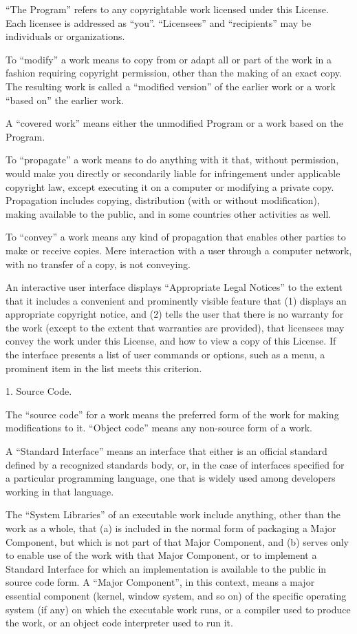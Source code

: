 \documentclass[letterpaper,12pt]{article}
\begin{document}
{``The Program'' refers to any copyrightable work licensed under this License. Each licensee is addressed as ``you''. ``Licensees'' and ``recipients'' may be individuals or organizations.

To ``modify'' a work means to copy from or adapt all or part of the work in a fashion requiring copyright permission, other than the making of an exact copy. The resulting work is called a ``modified version'' of the earlier work or a work ``based on'' the earlier work.

A ``covered work'' means either the unmodified Program or a work based on the Program.

To ``propagate'' a work means to do anything with it that, without permission, would make you directly or secondarily liable for infringement under applicable copyright law, except executing it on a computer or modifying a private copy. Propagation includes copying, distribution (with or without modification), making available to the public, and in some countries other activities as well.

To ``convey'' a work means any kind of propagation that enables other parties to make or receive copies. Mere interaction with a user through a computer network, with no transfer of a copy, is not conveying.

An interactive user interface displays ``Appropriate Legal Notices'' to the extent that it includes a convenient and prominently visible feature that (1) displays an appropriate copyright notice, and (2) tells the user that there is no warranty for the work (except to the extent that warranties are provided), that licensees may convey the work under this License, and how to view a copy of this License. If the interface presents a list of user commands or options, such as a menu, a prominent item in the list meets this criterion.

1. Source Code.

The ``source code'' for a work means the preferred form of the work for making modifications to it. ``Object code'' means any non-source form of a work.

A ``Standard Interface'' means an interface that either is an official standard defined by a recognized standards body, or, in the case of interfaces specified for a particular programming language, one that is widely used among developers working in that language.

The ``System Libraries'' of an executable work include anything, other than the work as a whole, that (a) is included in the normal form of packaging a Major Component, but which is not part of that Major Component, and (b) serves only to enable use of the work with that Major Component, or to implement a Standard Interface for which an implementation is available to the public in source code form. A ``Major Component'', in this context, means a major essential component (kernel, window system, and so on) of the specific operating system (if any) on which the executable work runs, or a compiler used to produce the work, or an object code interpreter used to run it.

}
\end{document}
